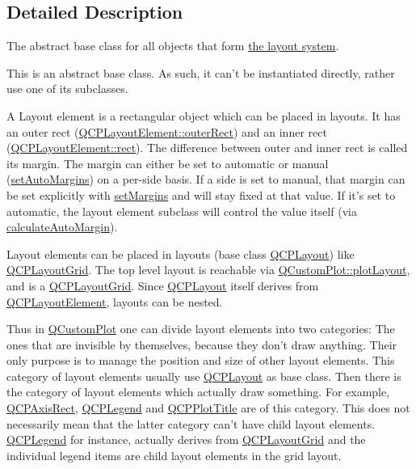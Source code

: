 \subsection{Detailed Description}
The abstract base class for all objects that form \hyperlink{thelayoutsystem}{the layout system}. 

This is an abstract base class. As such, it can't be instantiated directly, rather use one of its subclasses.

A Layout element is a rectangular object which can be placed in layouts. It has an outer rect (\hyperlink{class_q_c_p_layout_element_a60bbddee2d1230c2414bd776f44d17b8}{Q\-C\-P\-Layout\-Element\-::outer\-Rect}) and an inner rect (\hyperlink{class_q_c_p_layout_element_affdfea003469aac3d0fac5f4e06171bc}{Q\-C\-P\-Layout\-Element\-::rect}). The difference between outer and inner rect is called its margin. The margin can either be set to automatic or manual (\hyperlink{class_q_c_p_layout_element_accfda49994e3e6d51ed14504abf9d27d}{set\-Auto\-Margins}) on a per-\/side basis. If a side is set to manual, that margin can be set explicitly with \hyperlink{class_q_c_p_layout_element_a8f450b1f3f992ad576fce2c63d8b79cf}{set\-Margins} and will stay fixed at that value. If it's set to automatic, the layout element subclass will control the value itself (via \hyperlink{class_q_c_p_layout_element_a005c9f0fe84bc1591a2cf2c46fd477b4}{calculate\-Auto\-Margin}).

Layout elements can be placed in layouts (base class \hyperlink{class_q_c_p_layout}{Q\-C\-P\-Layout}) like \hyperlink{class_q_c_p_layout_grid}{Q\-C\-P\-Layout\-Grid}. The top level layout is reachable via \hyperlink{class_q_custom_plot_afd280d4d621ae64a106543a545c508d7}{Q\-Custom\-Plot\-::plot\-Layout}, and is a \hyperlink{class_q_c_p_layout_grid}{Q\-C\-P\-Layout\-Grid}. Since \hyperlink{class_q_c_p_layout}{Q\-C\-P\-Layout} itself derives from \hyperlink{class_q_c_p_layout_element}{Q\-C\-P\-Layout\-Element}, layouts can be nested.

Thus in \hyperlink{class_q_custom_plot}{Q\-Custom\-Plot} one can divide layout elements into two categories\-: The ones that are invisible by themselves, because they don't draw anything. Their only purpose is to manage the position and size of other layout elements. This category of layout elements usually use \hyperlink{class_q_c_p_layout}{Q\-C\-P\-Layout} as base class. Then there is the category of layout elements which actually draw something. For example, \hyperlink{class_q_c_p_axis_rect}{Q\-C\-P\-Axis\-Rect}, \hyperlink{class_q_c_p_legend}{Q\-C\-P\-Legend} and \hyperlink{class_q_c_p_plot_title}{Q\-C\-P\-Plot\-Title} are of this category. This does not necessarily mean that the latter category can't have child layout elements. \hyperlink{class_q_c_p_legend}{Q\-C\-P\-Legend} for instance, actually derives from \hyperlink{class_q_c_p_layout_grid}{Q\-C\-P\-Layout\-Grid} and the individual legend items are child layout elements in the grid layout. 

